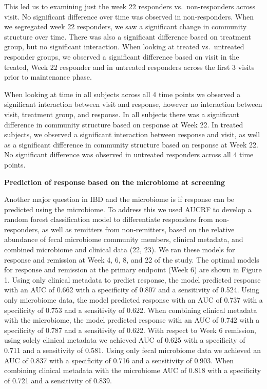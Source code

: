 \documentclass[11pt,]{article}
\begin{document}
This led us to examining just the week 22 responders vs.~non-responders
across visit. No significant difference over time was observed in
non-responders. When we segregated week 22 responders, we saw a
significant change in community structure over time. There was also a
significant difference based on treatment group, but no significant
interaction. When looking at treated vs.~untreated responder groups, we
observed a significant difference based on visit in the treated, Week 22
responder and in untreated responders across the first 3 visits prior to
maintenance phase.

When looking at time in all subjects across all 4 time points we
observed a significant interaction between visit and response, however
no interaction between visit, treatment group, and response. In all
subjects there was a significant difference in community structure based
on response at Week 22. In treated subjects, we observed a significant
interaction between response and visit, as well as a significant
difference in community structure based on response at Week 22. No
significant difference was observed in untreated responders across all 4
time points.

\textbf{Prediction of response based on the microbiome at screening}

Another major question in IBD and the microbiome is if response can be
predicted using the microbiome. To address this we used AUCRF to develop
a random forest classification model to differentiate responders from
non-responders, as well as remitters from non-remitters, based on the
relative abundance of fecal microbiome community members, clinical
metadata, and combined microbiome and clinical data (22, 23). We ran
these models for response and remission at Week 4, 6, 8, and 22 of the
study. The optimal models for response and remission at the primary
endpoint (Week 6) are shown in Figure 1. Using only clinical metadata to
predict response, the model predicted response with an AUC of 0.662 with
a specificity of 0.807 and a sensitivity of 0.524. Using only microbiome
data, the model predicted response with an AUC of 0.737 with a
specificity of 0.753 and a sensitivity of 0.622. When combining clinical
metadata with the microbiome, the model predicted response with an AUC
of 0.742 with a specificity of 0.787 and a sensitivity of 0.622. With
respect to Week 6 remission, using solely clinical metadata we achieved
AUC of 0.625 with a specificity of 0.711 and a sensitivity of 0.581.
Using only fecal microbiome data we achieved an AUC of 0.837 with a
specificity of 0.716 and a sensitivity of 0.903. When combining clinical
metadata with the microbiome AUC of 0.818 with a specificity of 0.721
and a sensitivity of 0.839.
\end{document}
